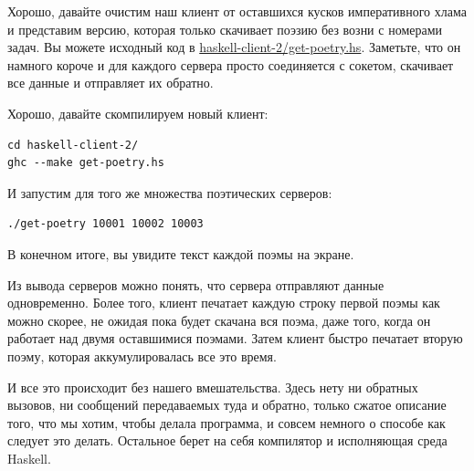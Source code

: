 Хорошо, давайте очистим наш клиент от оставшихся кусков императивного 
хлама и представим версию, которая только скачивает поэзию без возни с 
номерами задач. Вы можете исходный код в 
\href{https://github.com/jdavisp3/twisted-intro/blob/master/haskell-client-2/get-poetry.hs}{haskell-client-2/get-poetry.hs}. 
Заметьте, что он намного короче и для каждого сервера просто 
соединяется с сокетом, скачивает все данные и 
отправляет их обратно.


Хорошо, давайте скомпилируем новый клиент:

\begin{scriptsize}\begin{verbatim}
cd haskell-client-2/
ghc --make get-poetry.hs
\end{verbatim}\end{scriptsize}


И запустим для того же множества поэтических серверов:
\begin{scriptsize}\begin{verbatim}
./get-poetry 10001 10002 10003
\end{verbatim}\end{scriptsize}


В конечном итоге, вы увидите текст каждой поэмы на экране.


Из вывода серверов можно понять, что сервера отправляют 
данные одновременно. Более того, клиент печатает каждую 
строку первой поэмы как можно скорее, не ожидая пока 
будет скачана вся поэма, даже того, когда он работает 
над двумя оставшимися поэмами. Затем клиент быстро 
печатает вторую поэму, которая аккумулировалась все это время.


И все это происходит без нашего вмешательства. 
Здесь нету ни обратных вызовов, ни сообщений передаваемых 
туда и обратно, только сжатое описание того, что мы 
хотим, чтобы делала программа, и совсем немного о способе 
как следует это делать. Остальное берет на себя компилятор и 
исполняющая среда Haskell.


